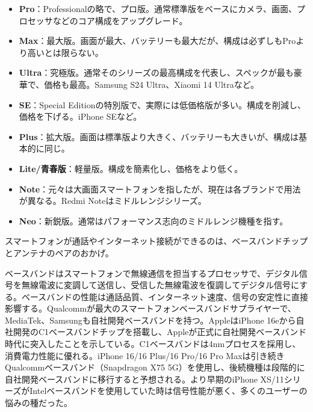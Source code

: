 
\begin{itemize}
  \item \textbf{Pro}：Professionalの略で、プロ版。通常標準版をベースにカメラ、画面、プロセッサなどのコア構成をアップグレード。
  \item \textbf{Max}：最大版。画面が最大、バッテリーも最大だが、構成は必ずしもProより高いとは限らない。
  \item \textbf{Ultra}：究極版。通常そのシリーズの最高構成を代表し、スペックが最も豪華で、価格も最高。Samsung S24 Ultra、Xiaomi 14 Ultraなど。
  \item \textbf{SE}：Special Editionの特別版で、実際には低価格版が多い。構成を削減し、価格を下げる。iPhone SEなど。
  \item \textbf{Plus}：拡大版。画面は標準版より大きく、バッテリーも大きいが、構成は基本的に同じ。
  \item \textbf{Lite/青春版}：軽量版。構成を簡素化し、価格をより低く。
  \item \textbf{Note}：元々は大画面スマートフォンを指したが、現在は各ブランドで用法が異なる。Redmi Noteはミドルレンジシリーズ。
  \item \textbf{Neo}：新鋭版。通常はパフォーマンス志向のミドルレンジ機種を指す。
\end{itemize}


スマートフォンが通話やインターネット接続ができるのは、ベースバンドチップとアンテナのペアのおかげ。


ベースバンドはスマートフォンで無線通信を担当するプロセッサで、デジタル信号を無線電波に変調して送信し、受信した無線電波を復調してデジタル信号にする。ベースバンドの性能は通話品質、インターネット速度、信号の安定性に直接影響する。Qualcommが最大のスマートフォンベースバンドサプライヤーで、MediaTek、Samsungも自社開発ベースバンドを持つ。AppleはiPhone 16eから自社開発のC1ベースバンドチップを搭載し、Appleが正式に自社開発ベースバンド時代に突入したことを示している。C1ベースバンドは4nmプロセスを採用し、消費電力性能に優れる。iPhone 16/16 Plus/16 Pro/16 Pro Maxは引き続きQualcommベースバンド（Snapdragon X75 5G）を使用し、後続機種は段階的に自社開発ベースバンドに移行すると予想される。より早期のiPhone XS/11シリーズがIntelベースバンドを使用していた時は信号性能が悪く、多くのユーザーの悩みの種だった。


